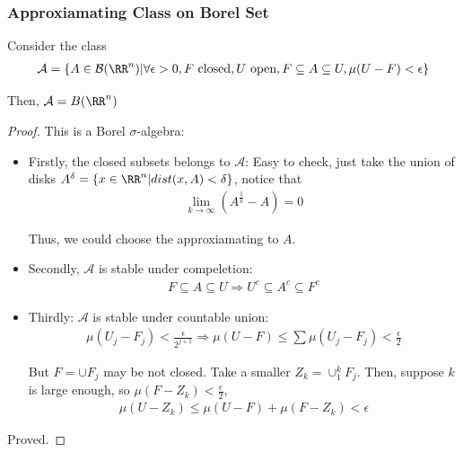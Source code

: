 \documentclass[Total.tex]{subfiles}
\begin{document}
			\subsubsection{Approxiamating Class on Borel Set}
			
				\begin{lemma}
					Consider the class
					\begin{gather*}
						\mathcal{A}=\{A\in \mathcal{B}(\RR^n)|\forall \epsilon>0, F\mbox{ closed},U\mbox{ open},F\subseteq A\subseteq U,\mu(U-F)<\epsilon\}
					\end{gather*}
					
					Then, $\mathcal{A}=B(\RR^n)$
				\end{lemma}
				\begin{proof}
					This is a Borel $\sigma$-algebra: 
					
					\begin{itemize}
						\item Firstly, the closed subsets belongs to $\mathcal{A}$: Easy to check, just take the union of disks $A^\delta=\{x\in \RR^n|dist(x,A)<\delta\}$, notice that
						\begin{gather*}
							\lim_{k\rightarrow\infty} (A^\frac{1}{k}-A)=0
						\end{gather*}
						
						Thus, we could choose the approxiamating to $A$.
						
						\item Secondly, $\mathcal{A}$ is stable under compeletion:
						\begin{gather*}
							F\subseteq A\subseteq U\Rightarrow U^c\subseteq A^c\subseteq F^c
						\end{gather*}
						
						\item Thirdly: $\mathcal{A}$ is stable under countable union:
						\begin{gather*}
							\mu(U_j-F_j)<\frac{\epsilon}{2^{j+1}}\Rightarrow \mu(U-F)\leq \sum \mu(U_j-F_j)<\frac{\epsilon}{2}
						\end{gather*} 
						
						But $F=\cup F_j$ may be not closed. Take a smaller $Z_k=\cup_{1}^k F_j$. Then, suppose $k$ is large enough, so $\mu(F-Z_k)<\frac{\epsilon}{2}$,
						\begin{gather*}
							\mu(U-Z_k)\leq \mu(U-F)+\mu(F-Z_k)<\epsilon
						\end{gather*}
					\end{itemize}
					
					Proved. 
				\end{proof}
			
\end{document}
